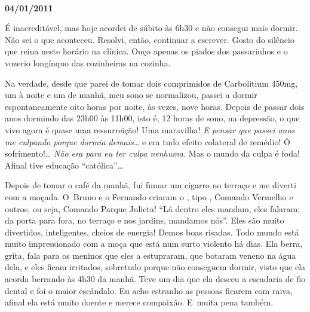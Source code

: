 \begin{center}\asterisc{}​\end{center}


\begin{flushright}\textbf{04/01/2011}\end{flushright}


É inacreditável, mas hoje acordei de súbito às 6h30 e não consegui mais
dormir. Não sei o que aconteceu. Resolvi, então, continuar a escrever.
Gosto do silêncio que reina neste horário na clínica. Ouço apenas os
piados dos passarinhos e o vozerio longínquo das cozinheiras na cozinha.

Na verdade, desde que parei de tomar dois comprimidos de Carbolitium 
450mg, um à noite e um de manhã, meu sono se normalizou, passei a dormir
espontaneamente oito horas por noite, às vezes, nove horas. Depois de
passar dois anos dormindo das 23h00 às 11h00, isto é, 12 horas de sono,
na depressão, o que vivo agora é quase uma ressurreição! Uma maravilha!
\emph{E pensar que passei anos me culpando porque dormia demais…}
e era tudo efeito colateral de remédio! Ô sofrimento!… \emph{Não
era para eu ter culpa nenhuma.} Mas o mundo da culpa é foda! Afinal tive
educação ``católica''…

Depois de tomar o café da manhã, fui fumar um cigarro no terraço e me
diverti com a moçada. O~Bruno e o Fernando criaram o , tipo ,
Comando Vermelho e outros, ou seja, Comando Parque Julieta! ``Lá dentro
eles mandam, eles falaram; da porta para fora, no terraço e nos jardins,
mandamos nós''. Eles são muito divertidos, inteligentes, cheios de
energia! Demos boas risadas. Todo mundo está muito impressionado com a
moça que está num surto violento há dias. Ela berra, grita, fala para os
meninos que eles a estupraram, que botaram veneno na água dela, e eles
ficam irritados, sobretudo porque não conseguem dormir, visto que ela
acorda berrando às 4h30 da manhã. Teve um dia que ela desceu a escadaria
de fio dental e foi o maior escândalo. Eu acho estranho as pessoas
ficarem com raiva, afinal ela está muito doente e merece compaixão. E~muita pena também.

